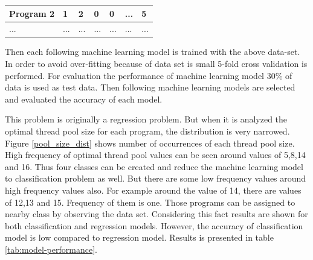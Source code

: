 \begin{table}[]
\begin{tabular}{|l|l|l|l|l|l|l|}
		Program 2                         & 1                                                                            & 2                                                                        & 0                                                                      & 0                                                                                               & ...                                                                  & 5                                                                               \\ \hline
		...                               & ...                                                                          & ...                                                                      & ...                                                                    & ...                                                                                             & ...                                                                  & ...                                                                             \\ \hline
	\end{tabular}
\end{table}

Then each following machine learning model is trained with the above data-set. In order to avoid over-fitting because of data set is small 5-fold cross validation is performed. For evaluation the performance of machine learning model 30\% of data is used as test data. Then following machine learning models are selected and evaluated the accuracy of each model.

This problem is originally a regression problem. But when it is analyzed the optimal thread pool size for each program, the distribution is very narrowed. Figure \ref{pool_size_dist} shows number of occurrences of each thread pool size. High frequency of optimal thread pool values can be seen around values of 5,8,14 and 16. Thus four classes can be created and reduce the machine learning model to classification problem as well. But there are some low frequency values around high frequency values also. For example around the value of 14, there are values of 12,13 and 15. Frequency of them is one. Those programs can be assigned to nearby class by observing the data set. Considering this fact results are shown for both classification and regression models. However, the accuracy of classification model is low compared to regression model. Results is presented in table \ref{tab:model-performance}.

